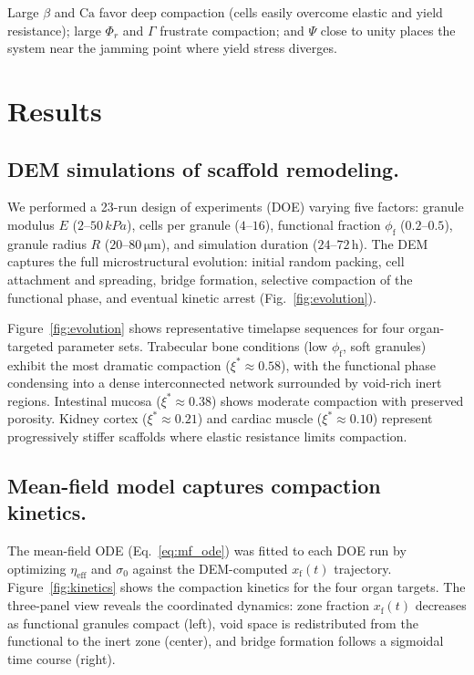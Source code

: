 \documentclass[9pt,twocolumn,twoside]{pnas-new}
\newcommand{\phif}{\phi_\mathrm{f}}
\newcommand{\xf}{x_\mathrm{f}}
\newcommand{\xistar}{\xi^{*}}
\newcommand{\sigmazero}{\sigma_0}
\newcommand{\etaeff}{\eta_\mathrm{eff}}
\newcommand{\um}{\,\si{\micro\metre}}
\newcommand{\kPa}{\,\si{kPa}}
\begin{document}
Large $\beta$ and $\mathrm{Ca}$ favor deep compaction (cells easily overcome
elastic and yield resistance); large $\Phi_r$ and $\Gamma$ frustrate
compaction; and $\Psi$ close to unity places the system near the jamming
point where yield stress diverges.

\section*{Results}

\subsection*{DEM simulations of scaffold remodeling.}

We performed a 23-run design of experiments (DOE) varying five factors:
granule modulus $E$ ($2$--$50\kPa$), cells per granule ($4$--$16$),
functional fraction $\phif$ ($0.2$--$0.5$), granule radius $R$
($20$--$80\um$), and simulation duration ($24$--$72$\,h). The DEM captures
the full microstructural evolution: initial random packing, cell attachment
and spreading, bridge formation, selective compaction of the functional
phase, and eventual kinetic arrest (Fig.~\ref{fig:evolution}).

Figure~\ref{fig:evolution} shows representative timelapse sequences for four
organ-targeted parameter sets. Trabecular bone conditions (low $\phif$, soft
granules) exhibit the most dramatic compaction ($\xistar \approx 0.58$), with
the functional phase condensing into a dense interconnected network
surrounded by void-rich inert regions. Intestinal mucosa ($\xistar \approx
0.38$) shows moderate compaction with preserved porosity. Kidney cortex
($\xistar \approx 0.21$) and cardiac muscle ($\xistar \approx 0.10$)
represent progressively stiffer scaffolds where elastic resistance limits
compaction.

\subsection*{Mean-field model captures compaction kinetics.}

The mean-field ODE (Eq.~\ref{eq:mf_ode}) was fitted to each DOE run by
optimizing $\etaeff$ and $\sigmazero$ against the DEM-computed $\xf(t)$
trajectory. Figure~\ref{fig:kinetics} shows the compaction kinetics for the
four organ targets. The three-panel view reveals the coordinated dynamics:
zone fraction $\xf(t)$ decreases as functional granules compact (left), void
space is redistributed from the functional to the inert zone (center), and
bridge formation follows a sigmoidal time course (right).
\end{document}
